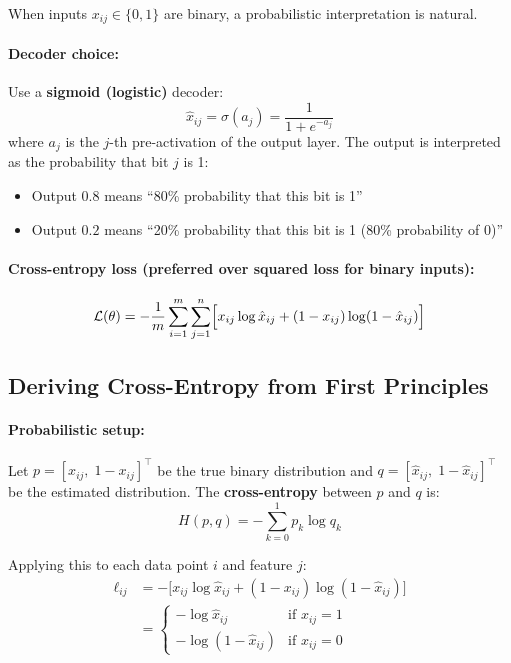 \documentclass[12pt,a4paper]{article}
\newcommand{\Loss}{\mathcal{L}}
\begin{document}
When inputs $x_{ij} \in \{0, 1\}$ are binary, a probabilistic interpretation is natural.

\paragraph{Decoder choice:} Use a \textbf{sigmoid (logistic)} decoder:
\[
  \hat{x}_{ij} = \sigma(a_j) = \frac{1}{1 + e^{-a_j}}
\]
where $a_j$ is the $j$-th pre-activation of the output layer. The output is interpreted as the probability that bit $j$ is 1:
\begin{itemize}
  \item Output $0.8$ means ``80\% probability that this bit is 1''
  \item Output $0.2$ means ``20\% probability that this bit is 1 (80\% probability of 0)''
\end{itemize}

\paragraph{Cross-entropy loss (preferred over squared loss for binary inputs):}
\[
  \Loss(\theta) = -\frac{1}{m}\sum_{i=1}^{m}\sum_{j=1}^{n}
    \Bigl[x_{ij}\log\hat{x}_{ij} + (1-x_{ij})\log(1-\hat{x}_{ij})\Bigr]
\]

\subsection{Deriving Cross-Entropy from First Principles}

\paragraph{Probabilistic setup:}
Let $p = [x_{ij},\; 1-x_{ij}]^\top$ be the true binary distribution and $q = [\hat{x}_{ij},\; 1-\hat{x}_{ij}]^\top$ be the estimated distribution. The \textbf{cross-entropy} between $p$ and $q$ is:
\[
  H(p,q) = -\sum_{k=0}^{1} p_k \log q_k
\]

Applying this to each data point $i$ and feature $j$:
\begin{align*}
  \ell_{ij}
  &= -\bigl[x_{ij}\log\hat{x}_{ij} + (1-x_{ij})\log(1-\hat{x}_{ij})\bigr]\\
  &= \begin{cases}
      -\log\hat{x}_{ij} & \text{if } x_{ij}=1\\
      -\log(1-\hat{x}_{ij}) & \text{if } x_{ij}=0
     \end{cases}
\end{align*}
\end{document}
